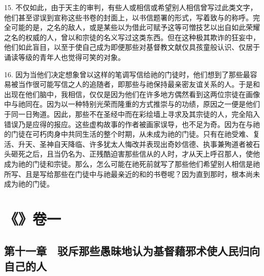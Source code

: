 15. 不仅如此，由于天主的审判，有些人或相信或希望别人相信曾写过此类文字，他们甚至谬误到宣称这些书卷的封面上，以书信题署的形式，写着致与的称呼。完全可能的是，之名的敌人，或是某些以为借此可赋予这等可憎技艺以出自如此荣耀之名的权威的人，曾以和宗徒的名义写过这类东西。但在这种极其欺诈的狂妄中，他们如此盲目，以至于使自己成为即便那些对基督教文献仅具孩童般认识、仅居于诵读等级的青年人也觉得可笑的对象。\par

16. 因为当他们决定想象曾以这样的笔调写信给祂的门徒时，他们想到了那些最容易被当作很可能写信之人的追随者，即那些与祂保持最亲密友谊关系的人。于是和出现在他们脑中，我相信，仅仅是因为他们在许多地方偶然看到这两位宗徒在画像中与祂同在。因为以一种特别光荣而隆重的方式推崇与的功绩，原因之一便是他们于同一日殉道。因此，那些不在圣经中而在彩绘墙上寻求及其宗徒的人，完全陷入错误乃是应得的报应。这些虚构故事的作者被画家误导，也不足为奇。因为在与祂的门徒在可朽肉身中共同生活的整个时期，从未成为祂的门徒。只有在祂受难、复活、升天、圣神自天降临、许多犹太人悔改并表现出奇妙信德、执事兼殉道者被石头砸死之后，且当仍名为、正残酷迫害那些信从的人时，才从天上呼召那人，使他成为祂的门徒和宗徒。那么，怎么可能在祂死前就写了那些他们希望别人相信是祂所写、且是写给那些在门徒中与祂最亲近的和的书卷呢？因为直到那时，根本尚未成为祂的门徒。\par



\section{《》卷一}


\subsection{第十一章　驳斥那些愚昧地认为基督藉邪术使人民归向自己的人}

